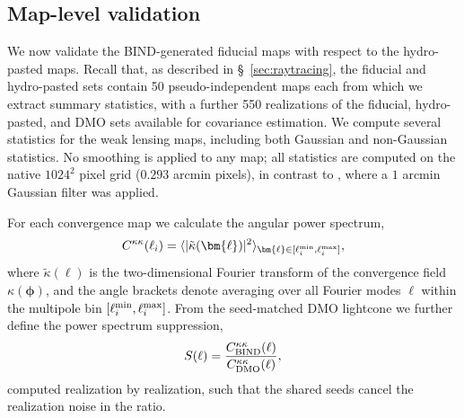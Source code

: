 \documentclass[linenumbers,trackchanges, twocolumn]{aastex701}
\begin{document}
\subsection{Map-level validation}\label{sec:val_map}
We now validate the BIND-generated fiducial maps with respect to the hydro-pasted maps. Recall that, as described in \S~\ref{sec:raytracing}, the fiducial and hydro-pasted sets contain 50 pseudo-independent maps each from which we extract summary statistics, with a further 550 realizations of the fiducial, hydro-pasted, and DMO sets available for covariance estimation. We compute several statistics for the weak lensing maps, including both Gaussian and non-Gaussian statistics. No smoothing is applied to any map; all statistics are computed on the native $1024^2$ pixel grid ($0.293$ arcmin pixels), in contrast to \citet{Lee-2023}, where a $1$ arcmin Gaussian filter was applied.
 
For each convergence map we calculate the angular power spectrum,
\begin{equation}\label{eq:C_l}
C^{\kappa\kappa}(\ell_i) = \langle|\tilde{\kappa}(\bm{\ell})|^2\rangle_{\bm{\ell} \in [\ell_i^{\rm min}, \ell_i^{\rm max}]},
\end{equation}
where $\tilde{\kappa}(\bm{\ell})$ is the two-dimensional Fourier transform of the convergence field $\kappa(\bm{\phi})$, and the angle brackets denote averaging over all Fourier modes $\bm{\ell}$ within the multipole bin $[\ell_i^{\rm min}, \ell_i^{\rm max}]$. From the seed-matched DMO lightcone we further define the power spectrum suppression,
\begin{equation}\label{eq:suppression}
S(\ell) = \frac{C^{\kappa\kappa}_{\rm BIND}(\ell)}{C^{\kappa\kappa}_{\rm DMO}(\ell)},
\end{equation}
computed realization by realization, such that the shared seeds cancel the realization noise in the ratio.
 
\end{document}
